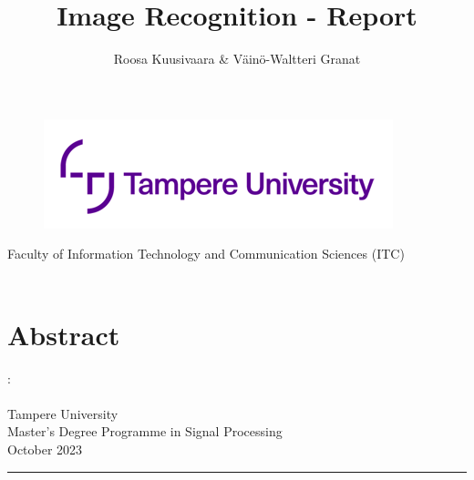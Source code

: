 \documentclass[12pt,a4paper,english
]{tunithesis}
\author{Roosa Kuusivaara \& Väinö-Waltteri Granat}
\title{Image Recognition - Report} %
\begin{document}
\makeatletter

\thispagestyle{empty}
\vspace*{-.5cm}\noindent

\begin{figure}
    \vspace{-1.3cm}
    \advance\leftskip-2.5cm
    \noindent\includegraphics{img/tunilogo.png}
\end{figure}
 
\vspace{2.5cm}
\begin{flushright}
\noindent\textsf{\LARGE{\@author}}

\noindent\vspace{0.5cm}

\noindent\Huge{\textsf{\textbf{\textcolor{tunipurple}{\@title}}}}
\end{flushright}
\vspace{13.7cm} %

\begin{flushright}  
    \begin{spacing}{1.0}
      \textsf{Faculty of Information Technology and Communication Sciences (ITC)\\
      \@thesistype\\}
    \end{spacing}
\end{flushright}

\if@twoside
\clearpage
\fi



\chapter*{Abstract}
\begin{spacing}{1.0}
\noindent \@author: \@title\\
\@thesistype\\
Tampere University\\
Master’s Degree Programme in Signal Processing\\
October 2023 \\
\end{spacing}
\noindent\rule{12cm}{0.4pt}
\end{document}
